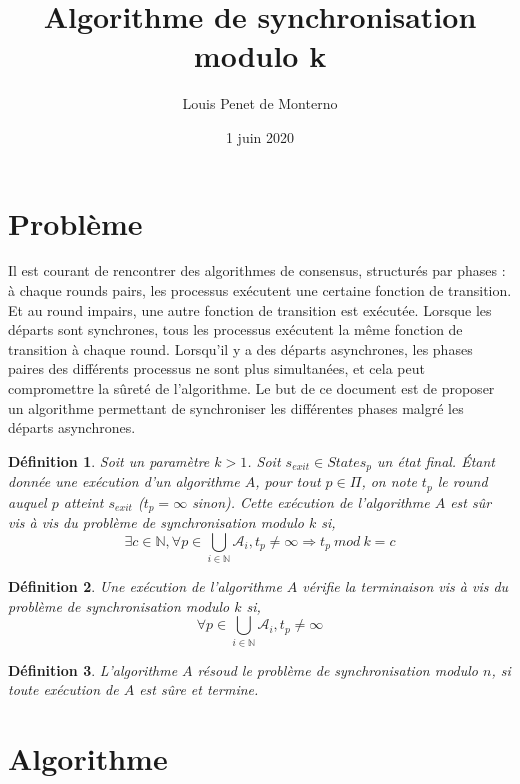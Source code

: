 \documentclass{article}
\title{Algorithme de synchronisation modulo k}
\date{1 juin 2020}
\author{Louis Penet de Monterno}
\newtheorem{definition}{Définition}
\begin{document}
\maketitle

\section{Problème}

Il est courant de rencontrer des algorithmes de consensus, structurés par phases : 
à chaque rounds pairs, les processus exécutent une certaine fonction de transition. Et au round impairs, une autre fonction de transition est exécutée.
Lorsque les départs sont synchrones, tous les processus exécutent la même fonction de transition à chaque round.
Lorsqu'il y a des départs asynchrones, les phases paires des différents processus ne sont plus simultanées, et cela peut compromettre la sûreté de l'algorithme.
Le but de ce document est de proposer un algorithme permettant de synchroniser les différentes phases malgré les départs asynchrones.

\begin{definition}

	Soit un paramètre $k > 1$. Soit $s_{exit} \in States_p$ un état final.
	Étant donnée une exécution d'un algorithme $A$, pour tout $p \in \Pi$, on note $t_p$ le round auquel $p$ atteint $s_{exit}$ ($t_p = \infty$ sinon).
	Cette exécution de l'algorithme $A$ est sûr vis à vis du problème de synchronisation modulo $k$ si,
	$$\exists c \in \mathds{N}, \forall p \in \bigcup\limits_{i \in \mathds{N}} \mathcal{A}_i, t_p \neq \infty \Rightarrow t_p~mod~k = c$$

\end{definition}

\begin{definition}

	Une exécution de l'algorithme $A$ vérifie la terminaison vis à vis du problème de synchronisation modulo $k$ si,
	$$\forall p \in \bigcup\limits_{i \in \mathds{N}} \mathcal{A}_i, t_p \neq \infty$$

\end{definition}
\begin{definition}

	L'algorithme $A$ résoud le problème de synchronisation modulo $n$, si toute exécution de $A$ est sûre et termine.

\end{definition}

\section{Algorithme}
\end{document}
